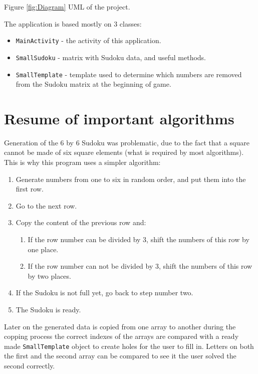 \documentclass[a4paper,twoside,12pt]{book}
\begin{document}
Figure \ref{fig:Diagram} UML of the project.

\par The application is based mostly on 3 classes:
\begin{itemize}

\item \lstinline|MainActivity| - the activity of this application.
\item \lstinline|SmallSudoku| - matrix with Sudoku data, and useful methods.
\item \lstinline|SmallTemplate| - template used to determine which numbers are removed from the Sudoku matrix at the beginning of game.

\end{itemize}

\section {Resume of important algorithms}
\par
Generation of the 6 by 6 Sudoku was problematic, due to the fact that a square cannot be made of six square elements (what is required by most algorithms). This is why this program uses a simpler algorithm:
\begin{enumerate}
	\item Generate numbers from one to six in random order, and put them into the first row.
	\item Go to the next row.
	\item Copy the content of the previous row and: 
	\begin{enumerate}
   		 \item If the row number can be divided by 3, shift the numbers of this row by one place.
   		 \item If the row number can not be divided by 3, shift the numbers of this row by two places.
  	\end{enumerate}
	\item If the Sudoku is not full yet, go back to step number two.
	\item The Sudoku is ready.
\end{enumerate}

\par Later on the generated data is copied from one array to another during the copping process the correct indexes of the arrays are compared with a ready made \lstinline|SmallTemplate| object to create holes for the user to fill in. Letters on both the first and the second array can be compared to see it the user solved the second correctly.
\end{document}
